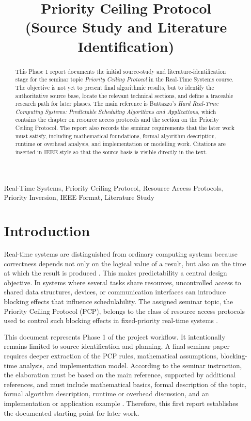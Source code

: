\documentclass[conference]{IEEEtran}
\title{Priority Ceiling Protocol
\\(Source Study and Literature Identification)}
\author{\IEEEauthorblockN{Daniel Chidi Chimezie}
\IEEEauthorblockA{Electronic Engineering\\
Hochschule Hamm-Lippstadt\\
Lippstadt, Germany\\
Matriculation Number: 1230515}}
\begin{document}
\maketitle

\begin{abstract}
This Phase 1 report documents the initial source-study and literature-identification stage for the seminar topic \emph{Priority Ceiling Protocol} in the Real-Time Systems course. The objective is not yet to present final algorithmic results, but to identify the authoritative source base, locate the relevant technical sections, and define a traceable research path for later phases. The main reference is Buttazzo's \emph{Hard Real-Time Computing Systems: Predictable Scheduling Algorithms and Applications}, which contains the chapter on resource access protocols and the section on the Priority Ceiling Protocol. The report also records the seminar requirements that the later work must satisfy, including mathematical foundations, formal algorithm description, runtime or overhead analysis, and implementation or modelling work. Citations are inserted in IEEE style so that the source basis is visible directly in the text.
\end{abstract}

\begin{IEEEkeywords}
Real-Time Systems, Priority Ceiling Protocol, Resource Access Protocols, Priority Inversion, IEEE Format, Literature Study
\end{IEEEkeywords}

\section{Introduction}
Real-time systems are distinguished from ordinary computing systems because correctness depends not only on the logical value of a result, but also on the time at which the result is produced \cite{Buttazzo2011}. This makes predictability a central design objective. In systems where several tasks share resources, uncontrolled access to shared data structures, devices, or communication interfaces can introduce blocking effects that influence schedulability. The assigned seminar topic, the Priority Ceiling Protocol (PCP), belongs to the class of resource access protocols used to control such blocking effects in fixed-priority real-time systems \cite{Buttazzo2011}.

This document represents Phase 1 of the project workflow. It intentionally remains limited to source identification and planning. A final seminar paper requires deeper extraction of the PCP rules, mathematical assumptions, blocking-time analysis, and implementation model. According to the seminar instruction, the elaboration must be based on the main reference, supported by additional references, and must include mathematical basics, formal description of the topic, formal algorithm description, runtime or overhead discussion, and an implementation or application example \cite{HenklerSeminar2026}. Therefore, this first report establishes the documented starting point for later work.
\end{document}
